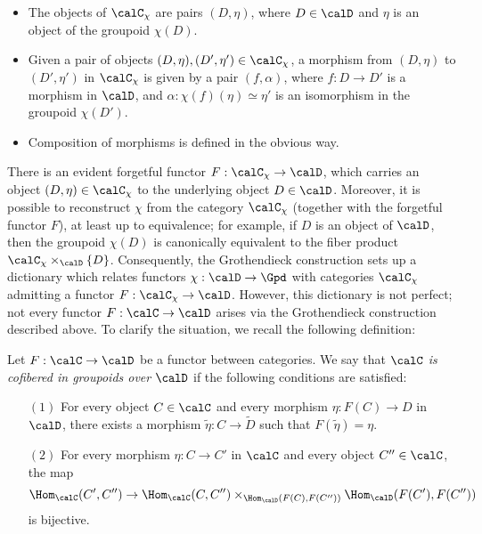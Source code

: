 \begin{itemize}
\item The objects of $\calC_{\chi}$ are pairs $(D, \eta)$, where $D \in \calD$
and $\eta$ is an object of the groupoid $\chi(D)$.
\item Given a pair of objects $(D, \eta), (D', \eta') \in \calC_{\chi}$, a
morphism from $(D, \eta)$ to $(D', \eta')$ in $\calC_{\chi}$ is given by
a pair $(f, \alpha)$, where $f: D \rightarrow D'$ is a morphism in 
$\calD$, and $\alpha: \chi(f)(\eta) \simeq \eta'$ is an isomorphism in the groupoid $\chi(D')$.
\item Composition of morphisms is defined in the obvious way.
\end{itemize}

There is an evident forgetful functor $F: \calC_{\chi} \rightarrow \calD$, which
carries an object $(D, \eta) \in \calC_{\chi}$ to the underlying object $D \in \calD$.
Moreover, it is possible to reconstruct $\chi$ from the category $\calC_{\chi}$
(together with the forgetful functor $F$), at least up to equivalence; for example, if $D$ is an object of $\calD$, then the groupoid $\chi(D)$ is canonically equivalent to the fiber product $\calC_{\chi} \times_{\calD} \{D\}$. Consequently, the Grothendieck construction sets up a dictionary which relates 
functors $\chi: \calD \rightarrow \Gpd$ with categories $\calC_{\chi}$ admitting a functor $F: \calC_{\chi} \rightarrow \calD$. However, this dictionary is not perfect; not every functor $F: \calC \rightarrow \calD$ arises via the Grothendieck construction described above. To clarify the situation, we recall the following definition:

\begin{definition}\label{latelate}
Let $F: \calC \rightarrow \calD$ be a functor between categories. We say that
{\it $\calC$ is cofibered in groupoids over $\calD$} if the following conditions are satisfied:
\begin{itemize}
\item[$(1)$] For every object $C \in \calC$ and every morphism
$\eta: F(C) \rightarrow D$ in $\calD$, there exists a morphism
$\widetilde{\eta}: C \rightarrow \widetilde{D}$ such that $F(\widetilde{\eta}) = \eta$.
\item[$(2)$] For every morphism $\eta: C \rightarrow C'$ in $\calC$ and every
object $C'' \in \calC$, the map
$$ \Hom_{\calC}(C',C'') \rightarrow \Hom_{\calC}(C,C'') \times_{ \Hom_{\calD}(F(C), F(C'')) } \Hom_{\calD}(F(C'), F(C''))$$ is bijective.
\end{itemize}
\end{definition}

